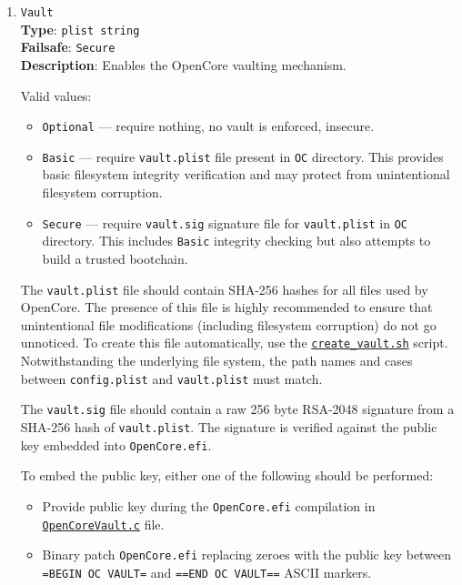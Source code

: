 \documentclass[]{article}
\providecommand{\tightlist}{%
  \setlength{\itemsep}{0pt}\setlength{\parskip}{0pt}}
\begin{document}
\begin{enumerate}
  For more details on how to configure Apple Secure Boot with UEFI Secure Boot,
  refer to the \hyperref[uefisecureboot]{UEFI Secure Boot} section.

\item \label{securevaulting}
  \texttt{Vault}\\
  \textbf{Type}: \texttt{plist\ string}\\
  \textbf{Failsafe}: \texttt{Secure}\\
  \textbf{Description}: Enables the OpenCore vaulting mechanism.

  Valid values:

  \begin{itemize}
  \tightlist
  \item \texttt{Optional} --- require nothing, no vault is enforced, insecure.
  \item \texttt{Basic} --- require \texttt{vault.plist} file present
  in \texttt{OC} directory. This provides basic filesystem integrity
  verification and may protect from unintentional filesystem corruption.
  \item \texttt{Secure} --- require \texttt{vault.sig} signature file for
  \texttt{vault.plist} in \texttt{OC} directory. This includes \texttt{Basic}
  integrity checking but also attempts to build a trusted bootchain.
  \end{itemize}

  The \texttt{vault.plist} file should contain SHA-256 hashes for all files used by OpenCore.
  The presence of this file is highly recommended to ensure that unintentional file modifications
  (including filesystem corruption) do not go unnoticed. To create this file automatically, use the
  \href{https://github.com/acidanthera/OpenCorePkg/tree/master/Utilities/CreateVault}{\texttt{create\_vault.sh}}
  script. Notwithstanding the underlying file system, the path names and cases between \texttt{config.plist}
  and \texttt{vault.plist} must match.

  The \texttt{vault.sig} file should contain a raw 256 byte RSA-2048 signature from a SHA-256
  hash of \texttt{vault.plist}. The signature is verified against the public key embedded
  into \texttt{OpenCore.efi}.

  To embed the public key, either one of the following should be performed:

  \begin{itemize}
  \tightlist
  \item Provide public key during the \texttt{OpenCore.efi} compilation in
  \href{https://github.com/acidanthera/OpenCorePkg/blob/master/Platform/OpenCore/OpenCoreVault.c}{\texttt{OpenCoreVault.c}} file.
  \item Binary patch \texttt{OpenCore.efi} replacing zeroes with the public key
  between \texttt{=BEGIN OC VAULT=} and \texttt{==END OC VAULT==} ASCII markers.
  \end{itemize}


\end{enumerate}
\end{document}
